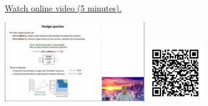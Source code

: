 
\begin{minipage}{10cm}
    \href{https://act4e-spring21.netlify.app/videos/spring2021-functorial-comp-a:design-queries.html}{Watch online video (5 minutes).}
        
    \href{https://act4e-spring21.netlify.app/videos/spring2021-functorial-comp-a:design-queries.html}{\includegraphics[height=3.5cm]{spring2021-functorial-comp-a:design-queries/thumbnails.jpg}}
    \href{https://act4e-spring21.netlify.app/videos/spring2021-functorial-comp-a:design-queries.html}{\includegraphics[height=2.5cm]{spring2021-functorial-comp-a:design-queries/qrcode.png}}
\end{minipage}
